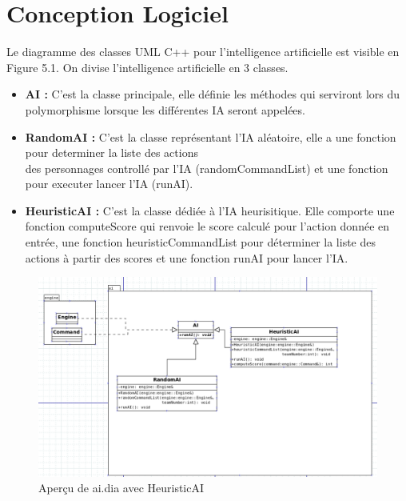 \section{Conception Logiciel}
Le diagramme des classes UML C++ pour l'intelligence artificielle est
visible en Figure 5.1.
On divise l'intelligence artificielle en 3 classes.

\begin{itemize}

\item \textbf{AI :} C'est la classe principale, elle définie les 
méthodes qui serviront lors du polymorphisme lorsque les 
différentes IA seront appelées.
\\
\item \textbf{RandomAI :} C'est la classe représentant l'IA 
aléatoire, elle a une fonction pour determiner la liste des actions \\
des personnages controllé par l'IA (randomCommandList) et une 
fonction pour executer lancer l'IA (runAI).
\\
\item \textbf{HeuristicAI :} C'est la classe dédiée à l'IA heurisitique. Elle comporte une fonction computeScore qui renvoie le score calculé pour l'action donnée en entrée, une fonction heuristicCommandList pour déterminer la liste des actions à partir des scores et une fonction runAI pour lancer l'IA.

\end{itemize}


\begin{figure}[H]
\includegraphics[width=\linewidth]{images/heuristic_ai_dia.png}
\centering
\caption{Aperçu de ai.dia avec HeuristicAI}
\label{fig:img3}
\end{figure}
\newpage
